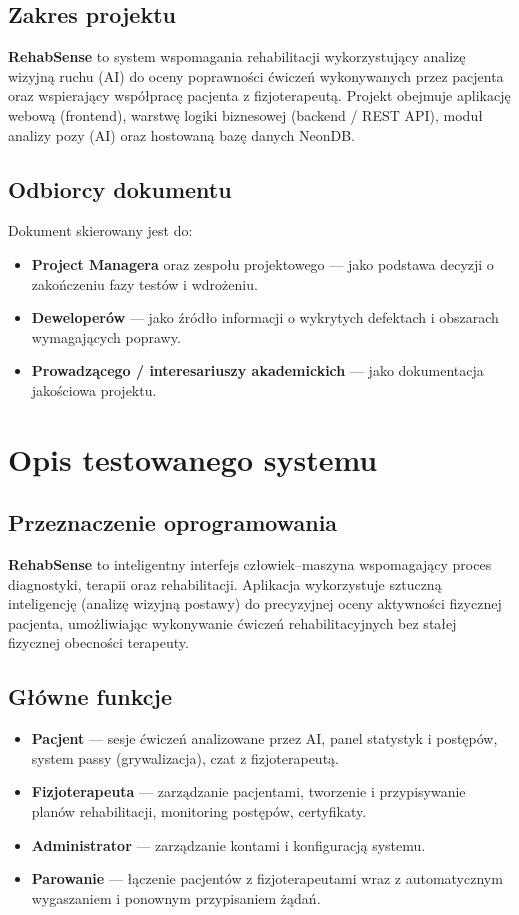 \documentclass[11pt,a4paper]{article}
\newcommand{\sysname}{\textbf{RehabSense}}
\begin{document}
\subsection{Zakres projektu}
\sysname{} to system wspomagania rehabilitacji wykorzystujący analizę wizyjną ruchu (AI) do oceny poprawności ćwiczeń wykonywanych przez pacjenta oraz wspierający współpracę pacjenta z fizjoterapeutą. Projekt obejmuje aplikację webową (frontend), warstwę logiki biznesowej (backend / REST API), moduł analizy pozy (AI) oraz hostowaną bazę danych NeonDB.

\subsection{Odbiorcy dokumentu}
Dokument skierowany jest do:
\begin{itemize}
  \item \textbf{Project Managera} oraz zespołu projektowego — jako podstawa decyzji o zakończeniu fazy testów i wdrożeniu.
  \item \textbf{Deweloperów} — jako źródło informacji o wykrytych defektach i obszarach wymagających poprawy.
  \item \textbf{Prowadzącego / interesariuszy akademickich} — jako dokumentacja jakościowa projektu.
\end{itemize}

\section{Opis testowanego systemu}

\subsection{Przeznaczenie oprogramowania}
\sysname{} to inteligentny interfejs człowiek–maszyna wspomagający proces diagnostyki, terapii oraz rehabilitacji. Aplikacja wykorzystuje sztuczną inteligencję (analizę wizyjną postawy) do precyzyjnej oceny aktywności fizycznej pacjenta, umożliwiając wykonywanie ćwiczeń rehabilitacyjnych bez stałej fizycznej obecności terapeuty.

\subsection{Główne funkcje}
\begin{itemize}
  \item \textbf{Pacjent} — sesje ćwiczeń analizowane przez AI, panel statystyk i postępów, system passy (grywalizacja), czat z fizjoterapeutą.
  \item \textbf{Fizjoterapeuta} — zarządzanie pacjentami, tworzenie i przypisywanie planów rehabilitacji, monitoring postępów, certyfikaty.
  \item \textbf{Administrator} — zarządzanie kontami i konfiguracją systemu.
  \item \textbf{Parowanie} — łączenie pacjentów z fizjoterapeutami wraz z automatycznym wygaszaniem i ponownym przypisaniem żądań.
\end{itemize}
\end{document}
